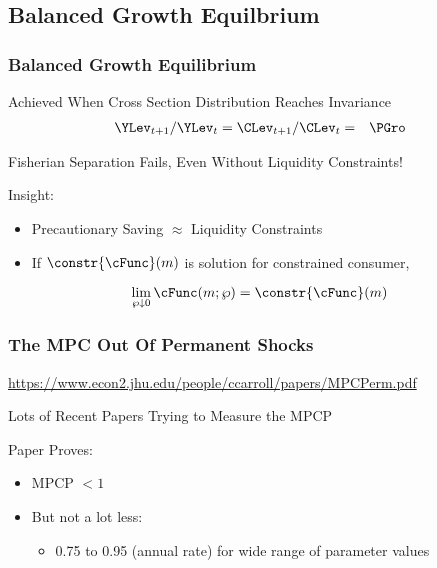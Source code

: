 \documentclass[pdflatex]{beamer}
\begin{document}
\subsection{Balanced Growth Equilbrium}
\begin{frame}
\frametitle{Balanced Growth Equilibrium}

Achieved When Cross Section Distribution Reaches Invariance
\begin{eqnarray}
  \YLev_{t+1}/\YLev_{t} = \CLev_{t+1}/\CLev_{t} & = & \PGro
\end{eqnarray}

Fisherian Separation Fails, Even Without Liquidity Constraints!
\medskip\medskip

\pause Insight:
\begin{itemize}
\item  Precautionary Saving $\approx$ Liquidity Constraints
\item If $\constr{\cFunc}(m)$ is solution for constrained consumer, 
\end{itemize}
\pause
\begin{equation}
\lim_{ \wp \downarrow 0} \cFunc(m;\wp) = \constr{\cFunc}(m)
\end{equation}


\end{frame}

\begin{frame}
\frametitle{The MPC Out Of Permanent Shocks}

\url{https://www.econ2.jhu.edu/people/ccarroll/papers/MPCPerm.pdf}
\medskip

Lots of Recent Papers Trying to Measure the MPCP

\medskip
Paper Proves:

\begin{itemize}
\item MPCP $< 1$
\item But not a lot less:
\begin{itemize}
\item 0.75 to 0.95 (annual rate) for wide range of parameter values
\end{itemize}
\end{itemize}

\end{frame}
\end{document}
